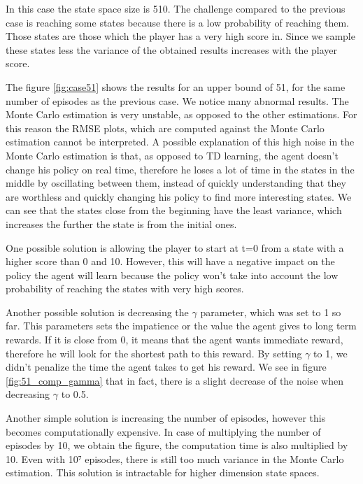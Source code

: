 \documentclass[12pt,a4paper]{article}
\begin{document}
In this case the state space size is 510. The challenge compared to the previous case is reaching some states because there is a low probability of reaching them. Those states are those which the player has a very high score in. Since we sample these states less the variance of the obtained results increases with the player score. 

The figure \ref{fig:case51} shows the results for an upper bound of 51, for the same number of episodes as the previous case. We notice many abnormal results. The Monte Carlo estimation is very unstable, as opposed to the other estimations. For this reason the RMSE plots, which are computed against the Monte Carlo estimation cannot be interpreted. 
A possible explanation of this high noise in the Monte Carlo estimation is that, as opposed to TD learning, the agent doesn't change his policy on real time, therefore he loses a lot of time in the states in the middle by oscillating between them, instead of quickly understanding that they are worthless and quickly changing his policy to find more interesting states. We can see that the states close from the beginning have the least variance, which increases the further the state is from the initial ones. 

One possible solution is allowing the player to start at t=0 from a state with a higher score than 0 and 10. However, this will have a negative impact on the policy the agent will learn because the policy won't take into account the low probability of reaching the states with very high scores.

Another possible solution is decreasing the $\gamma$ parameter, which was set to 1 so far. This parameters sets the impatience or the value the agent gives to long term rewards. If it is close from 0, it means that the agent wants immediate reward, therefore he will look for the shortest path to this reward. By setting $\gamma$ to 1, we didn't penalize the time the agent takes to get his reward. We see in figure \ref{fig:51_comp_gamma} that in fact, there is a slight decrease of the noise when decreasing $\gamma$ to 0.5.

Another simple solution is increasing the number of episodes, however this becomes computationally expensive. In case of multiplying the number of episodes by 10, we obtain the figure, the computation time is also multiplied by 10. Even with 10⁷ episodes, there is still too much variance in the Monte Carlo estimation. This solution is intractable for higher dimension state spaces. 
\end{document}
